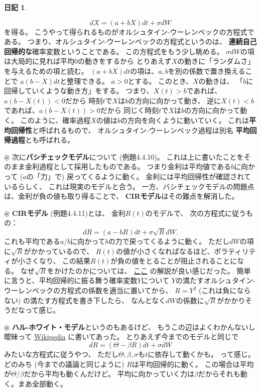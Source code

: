 \documentclass[uplatex]{jsarticle}
\theoremstyle{definition}
\newtheorem*{nikki*}{日記}
\begin{document}
\begin{nikki*}
\begin{itemize}
\[    dX = (a+bX)dt + \sigma dW
    \]
    を得る。
    こうやって得られるものがオルシュタイン-ウーレンベックの方程式である。
    つまり、オルシュタイン-ウーレンベックの方程式というのは、
    \textbf{連続自己回帰的な}確率変数ということである。
    この方程式をもう少し眺める。
    \(\sigma dW\)の項は大局的に見れば平均\(0\)の動きをするから
    とりあえず\(X\)の動きに「ランダムさ」を与えるための項と読む。
    \((a+bX)dt\)の項は、\(a,b\)を別の係数で置き換えることで
    \(a(b-X)dt\)と整理できる。
    \(a > 0\)とする。
    このとき、\(X\)の動きは、
    「\(b\)に回帰していくような動き方」をする。
    つまり、\(X(t)>b\)であれば、\(a(b-X(t))<0\)だから
    時刻\(t\)で\(X\)は\(b\)の方向に向かって動き、
    逆に\(X(t)<b\)であれば、\(a(b-X(t))>0\)だから
    同じく時刻\(t\)で\(X\)は\(b\)の方向に向かって動く。
    このように、確率過程\(X\)の値は\(b\)の方向を向くように動いていく。
    これは\textbf{平均回帰性}と呼ばれるもので、
    オルシュタイン-ウーレンベック過程は別名
    \textbf{平均回帰過程}とも呼ばれる。

    \(\circledast\)
    次に\textbf{バシチェックモデル}について
    (例題4.4.10)。
    これは上に書いたことをそのまま金利過程として採用したものである。
    つまり金利は平均値である\(b\)に向かって
    (\(a\)の「力」で) 戻ってくるように動く。
    金利には平均回帰性が確認されているらしく、
    これは現実のモデルと合う。
    一方、バシチェックモデルの問題点は、金利が負の値も取り得ることで、
    \textbf{CIRモデル}はその難点を解消した。

    \(\circledast\)
    \textbf{CIRモデル} (例題4.4.11)とは、
    金利\(R(t)\)のモデルで、
    次の方程式に従うもの：
    \[
    dR = (a-bR)dt + \sigma \sqrt{R}dW.
    \]
    これも平均である\(a/b\)に向かって\(b\)の力で戻ってくるように動く。
    ただし\(dW\)の項に\(\sqrt{R}\)がかかっているので、
    \(R(t)\)の値が小さくなればなるほど、ボラティリティが小さくなり、
    この結果\(R(t)\)が負の値をとることが阻止されることになる。
    なぜ\(\sqrt{R}\)をかけたのかについては、
    \href{http://mathfin.web.fc2.com/deriv2/imi_deriv224.html}{ここ}
    の解説が良い感じだった。
    簡単に言うと、平均回帰的に振る舞う確率変数\(Y\)について
    \(Y\)の満たすオルシュタイン-ウーレンベックの方程式の係数を適当に置いてから、
    \(R=Y^2\) (これは負にならない) の満たす方程式を書き下したら、
    なんとなく\(dW\)の係数に\(\sqrt{R}\)がかかりそうだなって感じ。

    \(\circledast\)
    \textbf{ハル-ホワイト・モデル}というのもあるけど、
    もうこの辺はよくわかんないし曖昧って
    \href{https://ja.wikipedia.org/wiki/%E3%83%8F%E3%83%AB%E3%83%BB%E3%83%9B%E3%83%AF%E3%82%A4%E3%83%88%E3%83%BB%E3%83%A2%E3%83%87%E3%83%AB}{Wikipedia}
    に書いてあった。
    とりあえず今までのモデルと同じで
    \[
    dR = (\Theta - \beta R)dt + \sigma dW
    \]
    みたいな方程式に従うやつ、
    ただし\(\Theta,\beta,\sigma\)も\(t\)に依存して動くかも。
    って感じ。
    どのみち (今までの議論と同じように) \(R\)は平均回帰的に動く。
    この場合は平均が\(\Theta/\beta\)だから平均も動くんだけど。
    平均に向かっていく力は\(\beta\)だからそれも動く。まあ全部動く。


\end{itemize}
\end{nikki*}
\end{document}
